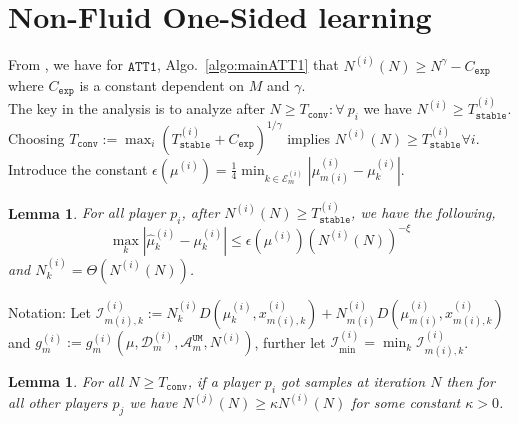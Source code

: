 \documentclass{article}
\newcommand{\stable}{\texttt{stable}}
\newtheorem{lemma}[theorem]{Lemma}
\begin{document}
\section{Non-Fluid One-Sided learning}
\label{app:nonfluid-one-sided}
From \cite[Proposition G.5, Statement 2]{bandyopadhyay2024optimal}, we have for $\texttt{ATT1}$, Algo.~\ref{algo:mainATT1} that $N^{(i)}(N)\geq N^{\gamma}-C_{\texttt{exp}}$ where $C_{\texttt{exp}}$ is a constant dependent on $M$ and $\gamma$. \\
The key in the analysis is to analyze after $N\geq T_{\texttt{conv}}: \forall\ p_i$ we have $N^{(i)}\geq T^{(i)}_{\stable}$. Choosing $T_{\texttt{conv}}:=\max_i\left(T_{\texttt{stable}}^{(i)}+C_{\texttt{exp}}\right)^{1/\gamma}$ implies $N^{(i)}(N) \geq T^{(i)}_{\stable} \forall i$. Introduce the constant $\epsilon(\mu^{(i)})=\frac{1}{4}\min_{k\in\mathcal{E}^{(i)}_m}|\mu^{(i)}_{m(i)}-\mu^{(i)}_k|$.
\begin{lemma}
    For all player $p_i$, after $N^{(i)}(N) \geq T^{(i)}_{\stable}$, we have the following, 
        \[\max_{k}|\hat{\mu}^{(i)}_k-\mu^{(i)}_k|\leq \epsilon(\mu^{(i)})(N^{(i)}(N))^{-\xi}\] and $N^{(i)}_k=\Theta(N^{(i)}(N))$.
        \label{lemma:localprop}
\end{lemma}
Notation: Let $\mathcal{I}^{(i)}_{m(i),k} := N^{(i)}_kD(\mu^{(i)}_k,x^{(i)}_{m(i),k})+N^{(i)}_{m(i)}D(\mu^{(i)}_{m(i)},x^{(i)}_{m(i),k})$ and $g^{(i)}_m:=g^{(i)}_{m}(\mu,\mathcal{D}^{(i)}_m,\mathcal{A}^{\texttt{UM}}_m,N^{(i)})$, further let $\mathcal{I}^{(i)}_{\min}=\min_k \mathcal{I}^{(i)}_{m(i),k}$.
\begin{lemma}
  For all $N\geq T_{\texttt{conv}}$,  if a player $p_i$ got samples at iteration $N$ then for all other players $p_j$ we have $N^{(j)}(N)\geq \kappa N^{(i)}(N)$ for some constant $\kappa>0$.
    \label{lemma:diffplayer}
\end{lemma}
\end{document}
